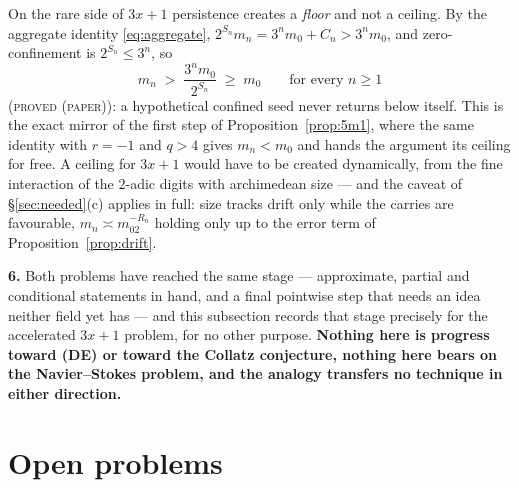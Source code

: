 \documentclass[11pt,reqno]{amsart}
\theoremstyle{plain}
\theoremstyle{definition}
\newcommand{\lab}[1]{\textnormal{\textsc{\small #1}}}
\begin{document}
On the rare side of $3x+1$ persistence creates a \emph{floor} and not a ceiling.
By the aggregate identity \eqref{eq:aggregate}, $2^{S_n}m_n=3^{n}m_0+C_n>3^{n}m_0$,
and zero-confinement is $2^{S_n}\le3^{n}$, so
\[
m_n\;>\;\frac{3^{n}m_0}{2^{S_n}}\;\ge\;m_0\qquad\text{for every }n\ge1
\]
(\lab{proved (paper)}): a hypothetical confined seed never returns below itself.
This is the exact mirror of the first step of Proposition~\ref{prop:5m1}, where the
same identity with $r=-1$ and $q>4$ gives $m_n<m_0$ and hands the argument its
ceiling for free. A ceiling for $3x+1$ would have to be created dynamically, from
the fine interaction of the $2$-adic digits with archimedean size --- and the caveat
of \S\ref{sec:needed}(c) applies in full: size tracks drift only while the carries
are favourable, $m_n\asymp m_02^{-R_n}$ holding only up to the error term of
Proposition~\ref{prop:drift}.

\medskip
\noindent\textbf{6.} Both problems have reached the same stage --- approximate,
partial and conditional statements in hand, and a final pointwise step that needs
an idea neither field yet has --- and this subsection records that stage precisely
for the accelerated $3x+1$ problem, for no other purpose. \textbf{Nothing here is
progress toward \textup{(DE)} or toward the Collatz conjecture, nothing here bears
on the Navier--Stokes problem, and the analogy transfers no technique in either
direction.}

\section{Open problems}\label{sec:open}
\end{document}
